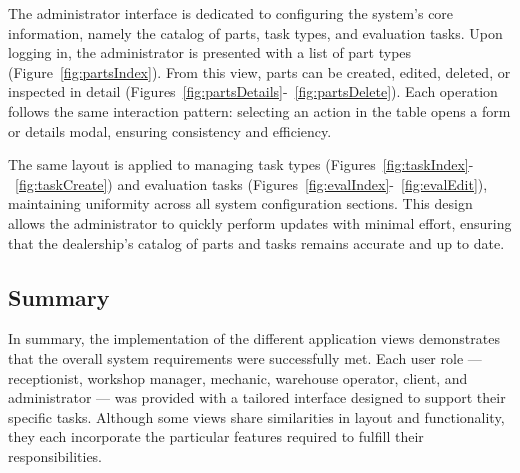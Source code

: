 The administrator interface is dedicated to configuring the system's core information, namely the catalog of parts, task types, and evaluation tasks. Upon logging in, the administrator is presented with a list of part types (Figure~\ref{fig:partsIndex}). From this view, parts can be created, edited, deleted, or inspected in detail (Figures~\ref{fig:partsDetails}-~\ref{fig:partsDelete}). Each operation follows the same interaction pattern: selecting an action in the table opens a form or details modal, ensuring consistency and efficiency.




The same layout is applied to managing task types (Figures~\ref{fig:taskIndex}-~\ref{fig:taskCreate}) and evaluation tasks (Figures~\ref{fig:evalIndex}-~\ref{fig:evalEdit}), maintaining uniformity across all system configuration sections. This design allows the administrator to quickly perform updates with minimal effort, ensuring that the dealership's catalog of parts and tasks remains accurate and up to date.


\subsection{Summary}

In summary, the implementation of the different application views demonstrates that the overall system requirements were successfully met. Each user role — receptionist, workshop manager, mechanic, warehouse operator, client, and administrator — was provided with a tailored interface designed to support their specific tasks. Although some views share similarities in layout and functionality, they each incorporate the particular features required to fulfill their responsibilities. 






